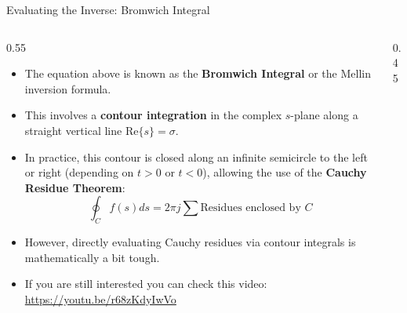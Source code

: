 \begin{frame}{Evaluating the Inverse: Bromwich Integral}
    \begin{columns}[T]
        \begin{column}{0.55\textwidth}
            \begin{itemize}
                \item The equation above is known as the \textbf{Bromwich Integral} or the Mellin inversion formula.
                \item This involves a \textbf{contour integration} in the complex $s$-plane along a straight vertical line $\text{Re}\{s\} = \sigma$.
                \item In practice, this contour is closed along an infinite semicircle to the left or right (depending on $t>0$ or $t<0$), allowing the use of the \textbf{Cauchy Residue Theorem}:
                      \begin{equation*}
                          \oint_C f(s) ds = 2\pi j \sum \text{Residues enclosed by } C
                      \end{equation*}
                \item However, directly evaluating Cauchy residues via contour integrals is mathematically a bit tough.
                \item If you are still interested you can check this video:\\ \url{https://youtu.be/r68zKdyIwVo}
            \end{itemize}
        \end{column}
        \begin{column}{0.45\textwidth}
            \begin{center}
\end{center}
\end{column}
\end{columns}
\end{frame}
